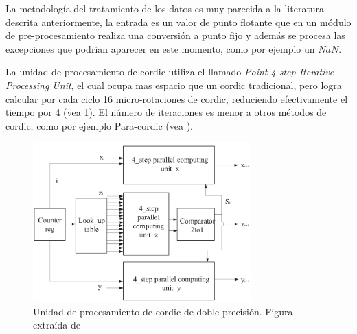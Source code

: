 La metodología del tratamiento de los datos es muy parecida a la literatura descrita anteriormente, la entrada es un valor de punto flotante que en un módulo de pre-procesamiento realiza una conversión a punto fijo y además se procesa las excepciones que podrían aparecer en este momento, como por ejemplo un $NaN$.

La unidad de procesamiento de \gls{cordic} utiliza el llamado \textit{Point 4-step Iterative Processing Unit}, el cual ocupa mas espacio que un \gls{cordic} tradicional, pero logra calcular por cada ciclo 16 micro-rotaciones de \gls{cordic}, reduciendo efectivamente el tiempo por 4 (vea \ref{graf:2019_4-step-64bit}). El número de iteraciones es menor a otros métodos de \gls{cordic}, como por ejemplo Para-\gls{cordic} (vea \cite{tso-bing_juang_para-cordic_2004}).

\begin{figure}[ht]
	\centering
	\includegraphics[width=0.75\textwidth]{archivos/CORDIC/2019_4-step-64bit.png}
	\caption{Unidad de procesamiento de \gls{cordic} de doble precisión. Figura extraída de \cite{yeshwanth_high-speed_2018}}
	\label{graf:2019_4-step-64bit}
\end{figure}

\begin{table}[]
	\centering
	\caption{Número de iteraciones comparando el multiplicador \gls{cordic} con punto flotante de \cite{yeshwanth_high-speed_2018} a otras soluciones.}
	\label{table:2019_4-step-comp-64bit}
\end{table}

